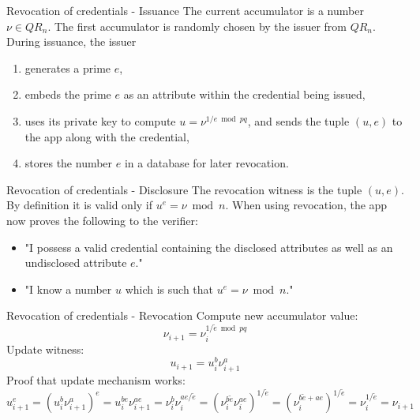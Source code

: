 \begin{frame}{Revocation of credentials - Issuance}
  The current accumulator is a number $\nu \in QR_n$. The first accumulator is randomly chosen by the issuer from $QR_n$. During issuance, the issuer\\

  \begin{enumerate}
    \item generates a prime $e$,
    \item embeds the prime $e$ as an attribute within the credential being issued,
    \item uses its private key to compute $u = \nu^{1/e\bmod pq}$, and sends the tuple $(u,e)$ to the app along with the credential,
    \item stores the number $e$ in a database for later revocation.
  \end{enumerate}

\end{frame}

\begin{frame}{Revocation of credentials - Disclosure}
  The revocation witness is the tuple $(u, e)$. By definition it is valid only if $u^e = \nu \bmod n$. When using revocation, the app now proves the following to the verifier:\\
  \begin{itemize}
    \item "I possess a valid credential containing the disclosed attributes as well as an undisclosed attribute $e$."
    \item "I know a number $u$ which is such that $u^e = \nu \bmod n$."
  \end{itemize}
\end{frame}

\begin{frame}{Revocation of credentials - Revocation}
  Compute new accumulator value:
  $$\displaystyle \nu_{i+1} = \nu_{i}^{1/\tilde{e}\bmod pq}$$
  Update witness:
  $$\displaystyle u_{i+1} = u_i^b\nu_{i+1}^a$$
  Proof that update mechanism works:
  $$
  u_{i+1}^{e} = (u_i^b\nu_{i+1}^a)^{e}
  = u_i^{be}\nu_{i+1}^{ae} 
  = \nu_i^{b}\nu_{i}^{ae/\tilde{e}}
  = (\nu_i^{b\tilde{e}}\nu_{i}^{ae})^{1/\tilde{e}}
  = (\nu_i^{b\tilde{e}+ae})^{1/\tilde{e}} 
  = \nu_i^{1/\tilde{e}}
  = \nu_{i+1}
  $$
  \note{
    }
\end{frame}

